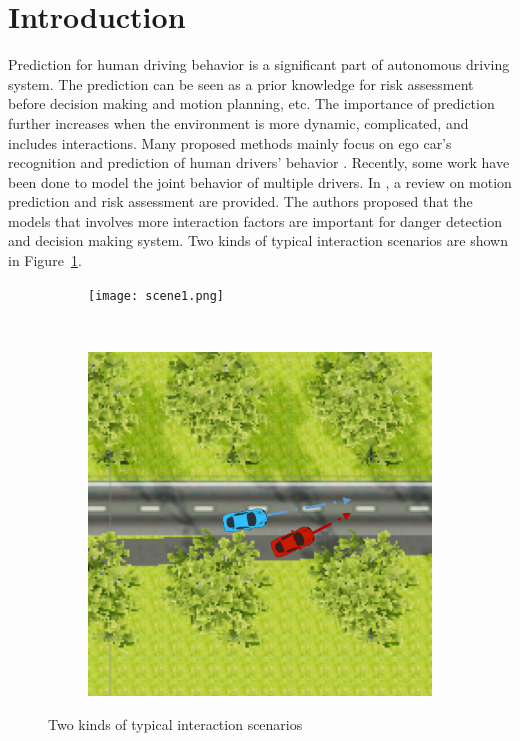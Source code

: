\documentclass[conference]{IEEEtran}
\begin{document}
\section{Introduction}
Prediction for human driving behavior is a significant part of autonomous driving system. The prediction can be seen as a prior knowledge for risk assessment before decision making and motion planning, etc. The importance of prediction further increases when the environment is more dynamic, complicated, and includes interactions. Many proposed methods mainly focus on ego car's recognition and prediction of human drivers' behavior \cite{ref:1,ref:2,ref:3,ref:4}. Recently, some work have been done to model the joint behavior of multiple drivers. In \cite{ref:5}, a review on motion prediction and risk assessment are provided. The authors proposed that the models that involves more interaction factors are important for danger detection and decision making system. Two kinds of typical interaction scenarios are shown in Figure~\ref{fig:interScen}.
\begin{figure}[h]
	\centering
	\begin{subfigure}[b]{0.2\textwidth}
		\texttt{[image: scene1.png]} 		
	\end{subfigure}
	\
	\begin{subfigure}[b]{0.2\textwidth}
		\includegraphics[width=1\textwidth]{scene2.png}
	\end{subfigure}
	\caption{Two kinds of typical interaction scenarios}
	\label{fig:interScen}
\end{figure}
\end{document}
